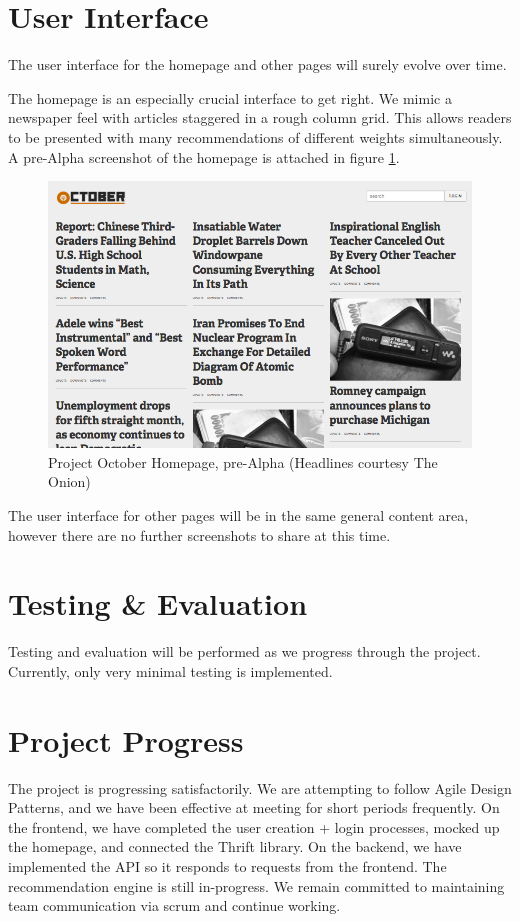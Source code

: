 \documentclass[11pt,letterpaper]{article}
\begin{document}
\section{User Interface}
The user interface for the homepage and other pages will surely evolve over time.

The homepage is an especially crucial interface to get right. We mimic a newspaper feel with articles staggered in a rough column grid.
This allows readers to be presented with many recommendations of different weights simultaneously.
A pre-Alpha screenshot of the homepage is attached in figure \ref{fig:homepage}.

\begin{figure}
\centering
\includegraphics[scale=0.35]{img/homepage.png}
\caption{Project October Homepage, pre-Alpha (Headlines courtesy The Onion)}
\label{fig:homepage}
\end{figure}

The user interface for other pages will be in the same general content area, however there are no further screenshots to share at this time.

\section{Testing \& Evaluation}
Testing and evaluation will be performed as we progress through the project. Currently, only very minimal testing is implemented.

\section{Project Progress}
The project is progressing satisfactorily.
We are attempting to follow Agile Design Patterns, and we have been effective at meeting for short periods frequently.
On the frontend, we have completed the user creation + login processes, mocked up the homepage, and connected the Thrift library.
On the backend, we have implemented the API so it responds to requests from the frontend. The recommendation engine is still in-progress.
We remain committed to maintaining team communication via scrum and continue working.
\end{document}
